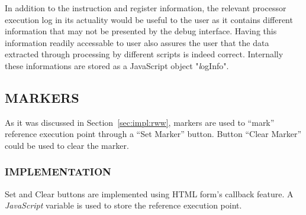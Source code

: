 In addition to the instruction and register information, the relevant processor execution log in its actuality would be useful to the user as it contains different information that may not be presented by the debug interface. Having this information readily accessable to user also assures the user that the data extracted through processing by different scripts is indeed correct. Internally these informations are stored as a JavaScript object "{\emph logInfo}". 


\subsection{MARKERS}
As it was discussed in Section~\ref{sec:impl:rww}, markers are used to ``mark'' reference execution point through a ``Set Marker'' button. Button ``Clear Marker'' could  be used to clear the marker.

\subsubsection{IMPLEMENTATION}

Set and Clear buttons are implemented using HTML form's callback feature. A {\it JavaScript} variable is used to store the reference execution point.


